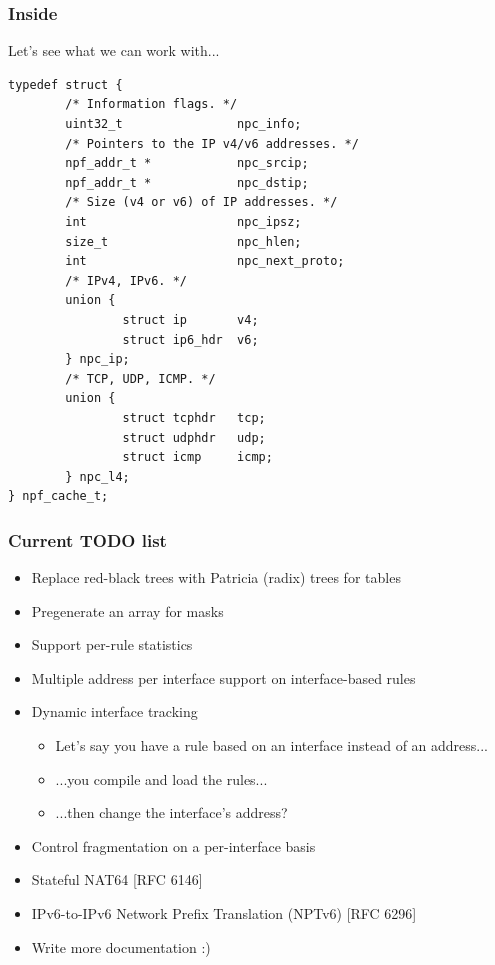 \documentclass{beamer}
\begin{document}
\begin{frame}[fragile]
\frametitle{Inside}
Let's see what we can work with...
{\tiny
\begin{verbatim}
typedef struct {
        /* Information flags. */
        uint32_t                npc_info;
        /* Pointers to the IP v4/v6 addresses. */
        npf_addr_t *            npc_srcip;
        npf_addr_t *            npc_dstip;
        /* Size (v4 or v6) of IP addresses. */
        int                     npc_ipsz;
        size_t                  npc_hlen;
        int                     npc_next_proto;
        /* IPv4, IPv6. */
        union {
                struct ip       v4;
                struct ip6_hdr  v6;
        } npc_ip;
        /* TCP, UDP, ICMP. */
        union {
                struct tcphdr   tcp;
                struct udphdr   udp;
                struct icmp     icmp;
        } npc_l4;
} npf_cache_t;
\end{verbatim}
}
\end{frame}

\begin{frame}
\frametitle{Current TODO list}
\begin{itemize}
	\item Replace red-black trees with Patricia (radix) trees for tables
\pause
	\item Pregenerate an array for masks
\pause
	\item Support per-rule statistics
\pause
	\item Multiple address per interface support on interface-based rules
	\item Dynamic interface tracking
		\begin{itemize}
			\item Let's say you have a rule based on an interface instead of an address...
			\item ...you compile and load the rules...
			\item ...then change the interface's address?
		\end{itemize}
	\item Control fragmentation on a per-interface basis
\pause
	\item Stateful NAT64 [RFC 6146]
	\item IPv6-to-IPv6 Network Prefix Translation (NPTv6) [RFC 6296]
\pause
	\item Write more documentation :)
\end{itemize}
\end{frame}
\end{document}
